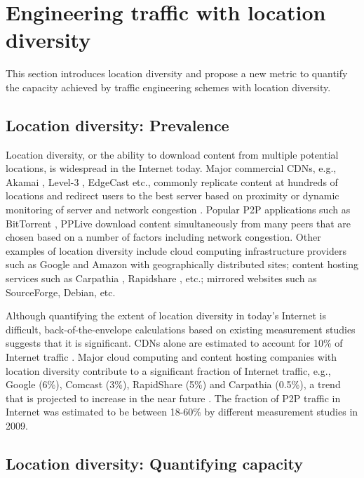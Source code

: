 \section{Engineering traffic with location diversity}
\label{sec:locdiv-background}

This section introduces location diversity and propose a new metric to quantify the capacity achieved by traffic engineering schemes with location diversity.


\subsection{Location diversity: Prevalence}

Location diversity, or the ability to download content from multiple potential locations, is widespread in the Internet today. Major commercial CDNs, e.g., Akamai \cite{Akamai}, Level-3 \cite{Level-3}, EdgeCast \cite{edgecast} etc., commonly replicate content at hundreds of locations and redirect users to the best server based on proximity or dynamic monitoring of server and network congestion \cite{akamai-detour}. Popular P2P applications such as BitTorrent \cite{bittorrentprotocol}, PPLive \cite{PPLive} download content simultaneously from many peers that are chosen based on a number of factors including network congestion. Other examples of location diversity include cloud computing infrastructure providers such as Google and Amazon with geographically distributed sites; content hosting services such as Carpathia \cite{Carpathia}, Rapidshare \cite{OneClickHosting}, etc.; mirrored websites such as SourceForge, Debian, etc. 


Although quantifying the extent of location diversity in today's Internet is difficult, back-of-the-envelope calculations based on existing measurement studies suggests that it is significant.  CDNs alone are estimated to account for 10\% of Internet traffic \cite{AtlasReport}. Major cloud computing and content hosting companies with location diversity contribute to a significant fraction of Internet traffic, e.g., Google (6\%), Comcast (3\%), RapidShare (5\%) and Carpathia (0.5\%), a trend that is projected to increase in the near future \cite{urlinternet,AtlasReport}. The fraction of P2P traffic in Internet was estimated to be between 18-60\% by different measurement studies in 2009.  


\subsection{Location diversity: Quantifying capacity}

